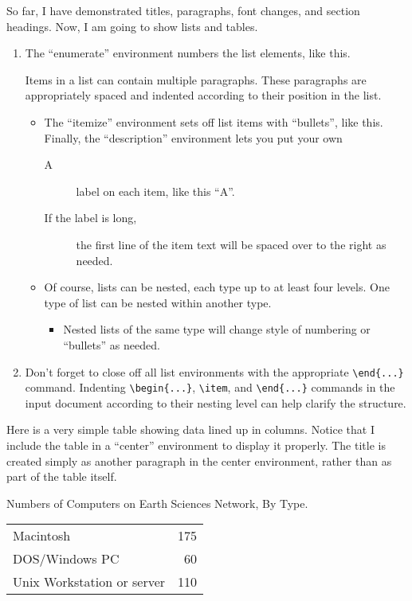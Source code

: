 So far, I have demonstrated titles, paragraphs, font changes, and
section headings.
Now, I am going to show lists and tables. 

\begin{enumerate}
\item
The ``enumerate'' environment numbers the list elements, like this.

Items in a list can contain multiple paragraphs.
These paragraphs are appropriately spaced and indented according to their
position in the list.
  \begin{itemize}
  \item The ``itemize'' environment sets off list items with ``bullets'',
like this. Finally, the ``description'' environment lets you put your own
    \begin{description}
    \item[A] label on each item, like this ``A''.
    \item[If the label is long,] the first line of the item text will
be spaced over to the right as needed.
    \end{description}

  \item Of course, lists can be nested, each type up to at least four levels.
One type of list can be nested within another type.
    \begin{itemize}
    \item Nested lists of the same type will change style of numbering
or ``bullets'' as needed.
   \end{itemize}
  \end{itemize}
\item Don't forget to close off all list environments with the
appropriate \verb+\end{...}+ command.
Indenting \verb+\begin{...}+, \verb+\item+, and \verb+\end{...}+
commands in the input document according to their nesting level can help
clarify the structure.
\end{enumerate} 

Here is a very simple table showing data lined up in columns.
Notice that I include the table in a ``center'' environment to display
it properly.
The title is created simply as another paragraph in the center environment,
rather than as part of the table itself.
\begin{center}
Numbers of Computers on Earth Sciences Network, By Type.

\begin{tabular}{lr}
Macintosh&175\\
DOS/Windows PC&60\\
Unix Workstation or server&110\\
\end{tabular}
\end{center} 

